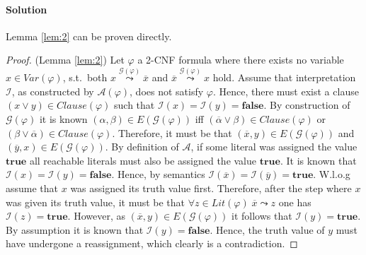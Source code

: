 \documentclass [11pt]{article}
\newcommand{\True}{\mathbf{true}}
\newcommand{\False}{\mathbf{false}}
\def\ox{\overline{x}}
\newcommand{\clau}{\mathit{Clause}}
\newcommand{\var}{\mathit{Var}}
\newcommand{\lit}{\mathit{Lit}}
\newcommand{\reach}{\leadsto}
\newcommand{\sreach}[1]{\stackrel{#1}{\leadsto}}
\begin{document}
\noindent
\paragraph*{Solution}


Lemma \ref{lem:2} can be proven directly.

\begin{proof}(Lemma \ref{lem:2})
Let $\varphi$ a 2-CNF formula where there exists no variable $x \in \var(\varphi)$, s.t.\ both $x \sreach{\mathcal{G}(\varphi)} \ox$ and $\ox \sreach{\mathcal{G}(\varphi)}  x$ hold.
Assume that interpretation $\mathcal{I}$, as constructed by $\mathcal{A}(\varphi)$, does not satisfy $\varphi$. Hence, there must exist a clause $(x \lor y) \in \clau(\varphi)$ such that $\mathcal{I}(x)=\mathcal{I}(y)=\False$.
By construction of $\mathcal{G}(\varphi)$ it is known $(\alpha , \beta) \in E(\mathcal{G}(\varphi))$ iff $(\overline{\alpha} \lor \beta)\in  \clau(\varphi)$ or $(\beta \lor \overline{\alpha})\in  \clau(\varphi)$. Therefore, it must be that 
$(\overline{x}, y) \in E(\mathcal{G}(\varphi))$ and $(\overline{y}, x) \in E(\mathcal{G}(\varphi))$. By definition of $\mathcal{A}$, if some literal was assigned the value $\True$ all reachable literals must also be assigned the value $\True$. It is known that $\mathcal{I}(x)=\mathcal{I}(y)=\False$. Hence, by semantics $\mathcal{I}(\overline{x})=\mathcal{I}(\overline{y})=\True$. W.l.o.g assume that $x$ was assigned its truth value first. Therefore, after the step where $x$ was given its truth value,  it must be that $\forall z \in \lit(\varphi)\; \overline{x} \reach z$ one has $\mathcal{I}(z) = \True$. However, as $(\overline{x}, y) \in E(\mathcal{G}(\varphi))$ it follows that $\mathcal{I}(y)=\True$. By assumption it is known that $\mathcal{I}(y)=\False$. Hence, the truth value of $y$ must have undergone a reassignment, which clearly is a contradiction.

%  
%  
%
%
%  
%   
%   
%


\end{proof}
\end{document}
